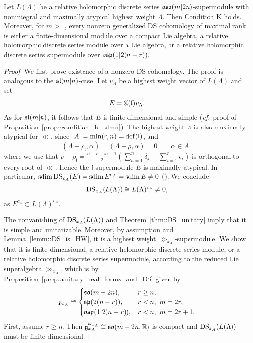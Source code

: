 \begin{proposition}
\label{prop::condition_K_osp}
Let $L(\Lambda)$ be a relative holomorphic discrete series ${\mathfrak{osp}}(m\vert2n)$-supermodule with nonintegral and maximally atypical highest weight $\Lambda$. Then Condition K holds. Moreover, for $m>1$, every nonzero generalized DS cohomology of maximal rank is either a finite-dimensional module over a compact Lie algebra, a relative holomorphic discrete series module over a Lie algebra, or a relative holomorphic discrete series supermodule over ${\mathfrak{osp}}(1\vert2(n-r))$.
\end{proposition}


\begin{proof}
We first prove existence of a nonzero
DS cohomology. The proof is analogous to the ${\mathfrak{sl}(m\vert n)}$-case. Let $v_\Lambda$ be a highest weight vector of $L(\Lambda)$ and set
\[
E={\mathfrak U}(\mathfrak l)v_\Lambda.
\]
As for ${\mathfrak{sl}(m\vert n)}$, it follows that $E$ is finite-dimensional and simple (\emph{cf.}~proof of Proposition~\ref{prop::condition_K_slmn}). The highest weight $\Lambda$ is also maximally atypical for $\ll$, since $|A|=\min(r,n)={\mathrm{def}}(\mathfrak l)$, and 
\[
(\Lambda+\rho_{\mathfrak l},\alpha)
=
(\Lambda+\rho,\alpha)=0
\qquad \alpha\in A,
\]
where we use that $
\rho-\rho_{\mathfrak l}
=
\frac{n+r-m+1}{2}
\left(
\sum_{a=1}^{n}\delta_a-\sum_{i=1}^{r}\epsilon_i
\right)
$ is orthogonal to every root of $\ll$.
Hence the
$\mathfrak l$-supermodule $E$ is maximally atypical.
In particular, 
$
\operatorname{sdim} \operatorname{DS}_{x_{A}}(E)=\operatorname{sdim} E^{c_{A}}= \operatorname{sdim} E\neq0
$
(\cite{serganova2011superdimension}). We conclude
\[
\operatorname{DS}_{x_A}(L(\Lambda))
\cong L(\Lambda)^{c_A}\neq0,
\]
as $E^{c_{A}} \subset L(\Lambda)^{c_{A}}$.


The nonvanishing of $\operatorname{DS}_{x_A}(L(\Lambda))$ and Theorem~\ref{thm::DS_unitary} imply that it is simple and unitarizable. Moreover, by assumption and Lemma~\ref{lemm::DS_is_HW}, it is a highest weight $\gg_{x_A}$-supermodule. We show that it is finite-dimensional, a relative holomorphic discrete series module, or a relative holomorphic discrete series supermodule, according to the reduced Lie superalgebra $\gg_{x_{A}}$, which is by Proposition~\ref{prop::unitary_real_forms_and_DS} given by
\[
{\mathfrak{g}}_{x_A}\cong
\begin{cases}
{\mathfrak{so}}(m-2n),&r\geq n,\\
{\mathfrak{sp}}(2(n-r)),&r<n,\ m=2r,\\
{\mathfrak{osp}}(1\vert2(n-r)),&r<n,\ m=2r+1.
\end{cases}
\]
First, assume $r\geq n$. Then ${\mathfrak{g}}_{x_{A}}^{\omega_{x_{A}}}\cong {\mathfrak{so}}(m-2n,{\mathbb R})$ is compact and $\operatorname{DS}_{x_A}(L(\Lambda))$ must be finite-dimensional.



\end{proof}
